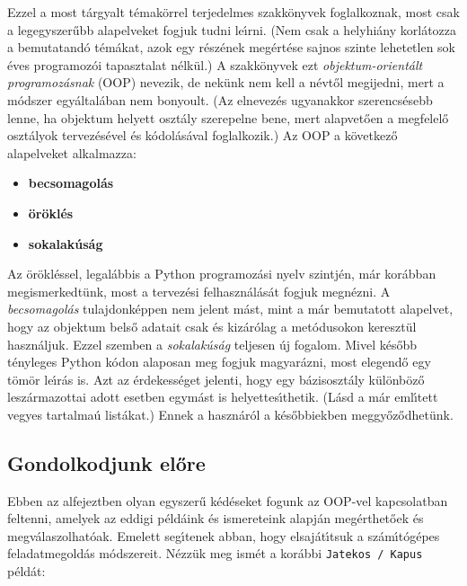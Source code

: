 Ezzel a most t\'argyalt t\'emak\"orrel terjedelmes szakk\"onyvek foglalkoznak, most csak a legegyszer\H{u}bb alapelveket 
fogjuk tudni le\'{\i}rni. (Nem csak a helyhi\'any korl\'a\-toz\-za a bemutatand\'o t\'em\'akat, azok egy r\'esz\'enek  
meg\'ert\'ese sajnos szinte lehetetlen sok \'eves programoz\'oi tapasztalat n\'elk\"ul.) A szakk\"onyvek ezt 
{\sl objektum-orient\'alt programoz\'asnak} (OOP)   nevezik, 
de nek\"unk nem kell a n\'evt\H{o}l megijedni, mert a m\'odszer egy\'altal\'aban nem bonyoult. (Az elnevez\'es 
ugyanakkor szerencs\'esebb lenne, ha objektum helyett oszt\'aly szerepelne bene, mert alapvet\H{o}en a megfelel\H{o} 
oszt\'alyok tervez\'es\'evel \'es k\'odol\'as\'aval foglalkozik.) Az OOP a k\"ovetkez\H{o} alapelveket alkalmazza:

\begin{itemize}
   \item {\bf becsomagol\'as}
   \item {\bf \"or\"okl\'es}
   \item {\bf sokalak\'us\'ag}
\end{itemize}

Az \"or\"okl\'essel, legal\'abbis a Python programoz\'asi nyelv szintj\'en, m\'ar kor\'abban megismerkedt\"unk, most a 
tervez\'esi felhaszn\'al\'as\'at fogjuk megn\'ezni. A {\sl becsomagol\'as}   tulajdonk\'eppen 
nem jelent m\'ast, mint a m\'ar bemutatott alapelvet, hogy az objektum bels\H{o} adatait csak \'es kiz\'ar\'olag a 
met\'odusokon kereszt\"ul haszn\'aljuk. Ezzel szemben a {\sl sokalak\'us\'ag}  teljesen \'uj 
fogalom. Mivel k\'es\H{o}bb t\'enyleges Python k\'odon alaposan meg fogjuk magyar\'azni, most elegend\H{o} egy 
t\"om\"or le\'{\i}r\'as is. Azt az \'erdekess\'eget jelenti, hogy egy b\'azisoszt\'aly k\"ul\"onb\"oz\H{o} 
lesz\'armazottai adott esetben egym\'ast is helyettes\'{\i}thetik. (L\'asd a m\'ar eml\'{\i}tett vegyes tartalma\'u 
list\'akat.) Ennek a haszn\'ar\'ol a k\'es\H{o}bbiekben meggy\H{o}z\H{o}dhet\"unk. 

\subsection{Gondolkodjunk el\H{o}re}

Ebben az alfejeztben olyan egyszer\H{u} k\'ed\'eseket fogunk az OOP-vel kapcsolatban feltenni, amelyek az eddigi p\'eld\'aink 
\'es ismereteink alapj\'an meg\'erthet\H{o}ek \'es meg\-v\'a\-la\-szol\-ha\-t\'o\-ak. Emelett seg\'{\i}tenek abban, hogy 
elsaj\'at\'{\i}tsuk a sz\'am\'{\i}t\'og\'epes feladatmegold\'as m\'od\-sze\-re\-it. N\'ezz\"uk meg ism\'et a kor\'abbi 
{\tt Jatekos / Kapus} p\'eld\'at:

